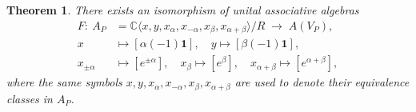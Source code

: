 \documentclass[12pt,a4paper,reqno]{amsart}
\numberwithin{equation}{section}
\numberwithin{equation}{section}
\newtheorem{thm}{Theorem}[section]
\theoremstyle{definition}
\def \C {\mathbb{C}}
\def \vac {\mathbf{1}}
\def\<{\langle}
\def\>{\rangle}
\begin{document}
	\begin{thm}\label{thm4.10}
		There exists an isomorphism of unital associative algebras
		\begin{equation}\label{4.27}
			\begin{aligned}
				F:\ 
				A_P
				&=\C\<x,y,x_\alpha,x_{-\alpha},x_\beta,x_{\alpha+\beta}\>/R
				\;\longrightarrow\;
				A(V_P),\\[4pt]
				x &\longmapsto [\alpha(-1)\vac],\quad 
				y \longmapsto [\beta(-1)\vac],\\
				x_{\pm\alpha} &\longmapsto [e^{\pm\alpha}],\quad 
				x_\beta \longmapsto [e^{\beta}],\quad 
				x_{\alpha+\beta} \longmapsto [e^{\alpha+\beta}],
			\end{aligned}
		\end{equation}
		where the same symbols $x,y,x_\alpha,x_{-\alpha},x_\beta,x_{\alpha+\beta}$ 
		are used to denote their equivalence classes in $A_P$.
	\end{thm}
	
\end{document}
